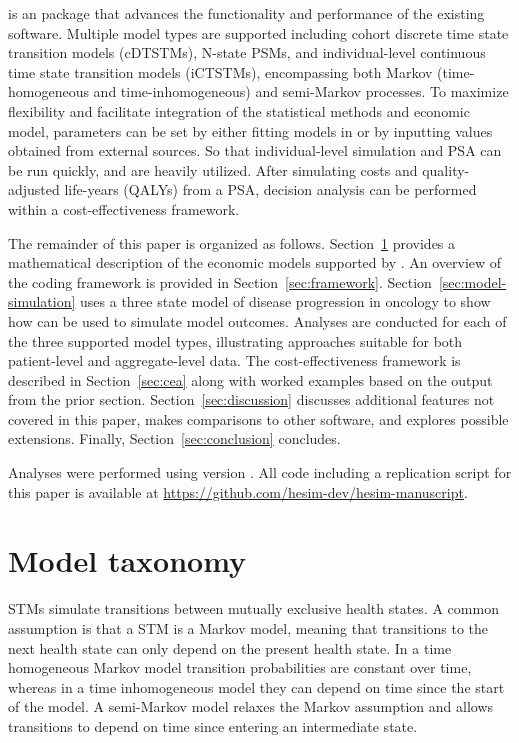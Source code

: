 \documentclass[article, nojss]{jss}\usepackage[]{graphicx}\usepackage[]{color}
\begin{document}
 is an  package that advances the functionality and performance of the existing software. Multiple model types are supported including cohort discrete time state transition models (cDTSTMs), N-state PSMs, and individual-level continuous time state transition models (iCTSTMs), encompassing both Markov (time-homogeneous and time-inhomogeneous) and semi-Markov processes. To maximize flexibility and facilitate integration of the statistical methods and economic model, parameters can be set by either fitting models in  or by inputting values obtained from external sources. So that individual-level simulation and PSA can be run quickly,  \citep{eddelbuettel2011rcpp, eddelbuettel2013rcpp, eddelbuettel2018rcpp} and  \citep{dowle2021datatable} are heavily utilized. After simulating costs and quality-adjusted life-years (QALYs) from a PSA, decision analysis can be performed within a cost-effectiveness framework.

The remainder of this paper is organized as follows. Section~\ref{sec:model-taxonomy} provides a mathematical description of the economic models supported by . An overview of the coding framework is provided in Section~\ref{sec:framework}. Section~\ref{sec:model-simulation} uses a three state model of disease progression in oncology to show how  can be used to simulate model outcomes. Analyses are conducted for each of the three supported model types, illustrating approaches suitable for both patient-level and aggregate-level data. The cost-effectiveness framework is described in Section~\ref{sec:cea} along with worked examples based on the output from the prior section. Section~\ref{sec:discussion} discusses additional features not covered in this paper, makes comparisons to other software, and explores possible extensions. Finally, Section~\ref{sec:conclusion} concludes. 

Analyses were performed using  version . All code including a replication  script for this paper is available at \url{https://github.com/hesim-dev/hesim-manuscript}.

\section{Model taxonomy} \label{sec:model-taxonomy}
STMs simulate transitions between mutually exclusive health states. A common assumption is that a STM is a Markov model, meaning that transitions to the next health state can only depend on the present health state. In a time homogeneous Markov model transition probabilities are constant over time, whereas in a time inhomogeneous model they can depend on time since the start of the model. A semi-Markov model relaxes the Markov assumption and allows transitions to depend on time since entering an intermediate state.
\end{document}
